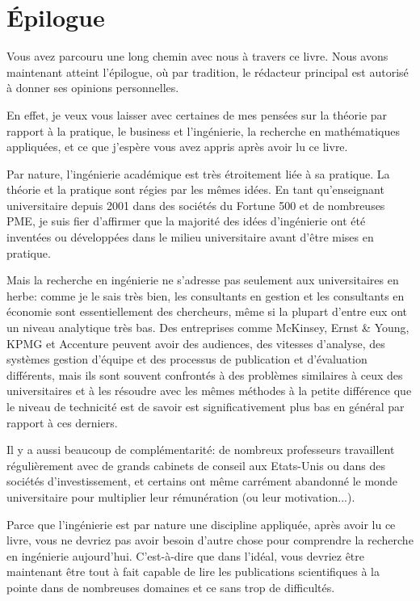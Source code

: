 \documentclass[12pt,a4paper,twoside,openright]{report}
\theoremstyle{definition}
\theoremstyle{itexmp}
\numberwithin{equation}{section}
\begin{document}
	
	
 	\chapter{Épilogue}
	Vous avez parcouru une long chemin avec nous à travers ce livre. Nous avons maintenant atteint l'épilogue, où par tradition, le rédacteur principal est autorisé à donner ses opinions personnelles.

	En effet, je veux vous laisser avec certaines de mes pensées sur la théorie par rapport à la pratique, le business et l'ingénierie, la recherche en mathématiques appliquées, et ce que j'espère vous avez appris après avoir lu ce livre.

	Par nature, l'ingénierie académique est très étroitement liée à sa pratique. La théorie et la pratique sont régies par les mêmes idées. En tant qu'enseignant universitaire depuis 2001 dans des sociétés du Fortune 500 et de nombreuses PME, je suis fier d'affirmer que la majorité des idées d'ingénierie ont été inventées ou développées dans le milieu universitaire avant d'être mises en pratique.
	
	Mais la recherche en ingénierie ne s'adresse pas seulement aux universitaires en herbe: comme je le sais très bien, les consultants en gestion et les consultants en économie sont essentiellement des chercheurs, même si la plupart d'entre eux ont un niveau analytique très bas. Des entreprises comme McKinsey, Ernst \& Young, KPMG et Accenture peuvent avoir des audiences, des vitesses d'analyse, des systèmes gestion d'équipe et des processus de publication et d'évaluation différents, mais ils sont souvent confrontés à des problèmes similaires à ceux des universitaires et à les résoudre avec les mêmes méthodes à la petite différence que le niveau de technicité est de savoir est significativement plus bas en général par rapport à ces derniers.

	Il y a aussi beaucoup de complémentarité: de nombreux professeurs travaillent régulièrement avec de grands cabinets de conseil aux Etats-Unis ou dans des sociétés d'investissement, et certains ont même carrément abandonné le monde universitaire pour multiplier leur rémunération (ou leur motivation...).

	Parce que l'ingénierie est par nature une discipline appliquée, après avoir lu ce livre, vous ne devriez pas avoir besoin d'autre chose pour comprendre la recherche en ingénierie aujourd'hui. C'est-à-dire que dans l'idéal, vous devriez être maintenant être tout à fait capable de lire les publications scientifiques à la pointe dans de nombreuses domaines et ce sans trop de difficultés.
	
\end{document}
